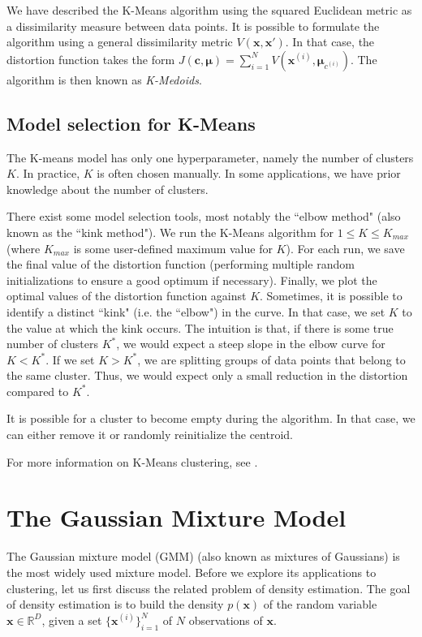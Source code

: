 \documentclass[final,3p,times,twocolumn]{elsarticle}
\begin{document}
We have described the K-Means algorithm using the squared Euclidean metric as a dissimilarity measure between data points.
It is possible to formulate the algorithm using a general dissimilarity metric $V(\boldsymbol x, \boldsymbol x')$.
In that case, the distortion function takes the form $J(\boldsymbol c, \boldsymbol \mu) = \sum_{i=1}^N V(\boldsymbol x^{(i)}, \boldsymbol \mu_{c^{(i)}})$.
The algorithm is then known as \emph{K-Medoids}.

\subsection{Model selection for K-Means}
The K-means model has only one hyperparameter, namely the number of clusters $K$.
In practice, $K$ is often chosen manually.
In some applications, we have prior knowledge about the number of clusters.

There exist some model selection tools, most notably the ``elbow method" (also known as the ``kink method").
We run the K-Means algorithm for $1 \leq K \leq K_{max}$ (where $K_{max}$ is some user-defined maximum value for $K$).
For each run, we save the final value of the distortion function (performing multiple random initializations to ensure a good optimum if necessary).
Finally, we plot the optimal values of the distortion function against $K$.
Sometimes, it is possible to identify a distinct ``kink" (i.e. the ``elbow") in the curve.
In that case, we set $K$ to the value at which the kink occurs.
The intuition is that, if there is some true number of clusters $K^*$, we would expect a steep slope in the elbow curve for $K < K^*$.
If we set $K > K^*$, we are splitting groups of data points that belong to the same cluster. Thus, we would expect only a small reduction in the distortion compared to $K^*$.

It is possible for a cluster to become empty during the algorithm.
In that case, we can either remove it or randomly reinitialize the centroid.

For more information on K-Means clustering, see \cite{Bishop}.


\section{The Gaussian Mixture Model}
The Gaussian mixture model (GMM) (also known as mixtures of Gaussians) is the most widely used mixture model.
Before we explore its applications to clustering, let us first discuss the related problem of density estimation.
The goal of density estimation is to build the density $p(\boldsymbol x)$ of the random variable $\boldsymbol x \in \mathbb{R}^D$, given a set $\{\boldsymbol x^{(i)}\}_{i=1}^N$ of $N$ observations of $\boldsymbol x$.
\end{document}
